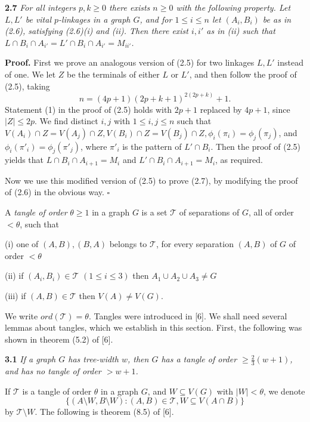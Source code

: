 \textbf{2.7} \textit{For all integers $p, k \ge 0$ there exists $n \ge 0$ with the following property. Let $L, L'$ be vital $p$-linkages in a graph $G$, and for $1 \le i \le n$ let $(A_i, B_i)$ be as in (2.6), satisfying (2.6)(i) and (ii). Then there exist $i, i'$ as in (ii) such that $L \cap B_i \cap A_{i'} = L' \cap B_i \cap A_{i'} = M_{ii'}$.}

\textbf{Proof.} First we prove an analogous version of (2.5) for two linkages $L, L'$ instead of one. We let $Z$ be the terminals of either $L$ or $L'$, and then follow the proof of (2.5), taking
\begin{equation*}
n = (4p + 1)(2p + k + 1)^{2(2p+k)} + 1.
\end{equation*}
Statement (1) in the proof of (2.5) holds with $2p + 1$ replaced by $4p + 1$, since $|Z| \le 2p$. We find distinct $i, j$ with $1 \le i, j \le n$ such that $V(A_i) \cap Z = V(A_j) \cap Z, V(B_i) \cap Z = V(B_j) \cap Z, \phi_i(\pi_i) = \phi_j(\pi_j)$, and $\phi_i(\pi'_i) = \phi_j(\pi'_j)$, where $\pi'_i$ is the pattern of $L' \cap B_i$. Then the proof of (2.5) yields that $L \cap B_i \cap A_{i+1} = M_i$ and $L' \cap B_i \cap A_{i+1} = M_i$, as required.

Now we use this modified version of (2.5) to prove (2.7), by modifying the proof of (2.6) in the obvious way. $\square$


A \textit{tangle of order} $\theta \ge 1$ in a graph $G$ is a set $\mathcal{T}$ of separations of $G$, all of order $< \theta$, such that

\hspace*{12pt}(i) one of $(A, B), (B, A)$ belongs to $\mathcal{T}$, for every separation $(A, B)$ of $G$ of order $< \theta$

\hspace*{12pt}(ii) if $(A_i, B_i) \in \mathcal{T}$ $(1 \le i \le 3)$ then $A_1 \cup A_2 \cup A_3 \ne G$

\hspace*{12pt}(iii) if $(A, B) \in \mathcal{T}$ then $V(A) \ne V(G)$.

We write $ord(\mathcal{T}) = \theta$. Tangles were introduced in [6]. We shall need several lemmas about tangles, which we establish in this section. First, the following was shown in theorem (5.2) of [6].

\textbf{3.1} \textit{If a graph $G$ has tree-width $w$, then $G$ has a tangle of order $\ge \frac{2}{3}(w + 1)$, and has no tangle of order $> w + 1$.}

If $\mathcal{T}$ is a tangle of order $\theta$ in a graph $G$, and $W \subseteq V(G)$ with $|W| < \theta$, we denote
\begin{equation*}
\{(A \setminus W, B \setminus W) : (A, B) \in \mathcal{T}, W \subseteq V(A \cap B)\}
\end{equation*}
by $\mathcal{T} \setminus W$. The following is theorem (8.5) of [6].
